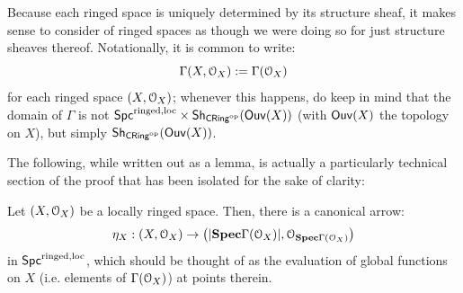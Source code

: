                 \begin{remark}
                    Because each ringed space is uniquely determined by its structure sheaf, it makes sense to consider  of ringed spaces as though we were doing so for just structure sheaves thereof. Notationally, it is common to write:
                        $$\Gamma(X, \mathcal{O}_X) := \Gamma(\mathcal{O}_X)$$
                    for each ringed space $(X, \mathcal{O}_X)$; whenever this happens, do keep in mind that the domain of $\Gamma$ is not $\Spc^{\ringed, \loc} \x \Sh_{\Cring^{\op}}(\Ouv(X))$ (with $\mathsf{Ouv}(X)$ the topology on $X$), but simply $\mathsf{Sh}_{\mathsf{CRing}^{\mathrm{op}}}(\mathsf{Ouv}(X))$.   
                \end{remark}
                    
                The following, while written out as a lemma, is actually a particularly technical section of the proof that has been isolated for the sake of clarity:
                \begin{lemma}\label{lemma: adjunction_unit_ringed_spaces}
                    Let $(X, \mathcal{O}_X)$ be a locally ringed space. Then, there is a canonical arrow:
                        $$\eta_X: (X, \mathcal{O}_X) \to \left(|\mathbf{Spec} \Gamma(\mathcal{O}_X)|, \mathcal{O}_{\mathbf{Spec} \Gamma(\mathcal{O}_X)}\right)$$
                    in $\mathsf{Spc}^{\mathrm{ringed}, \mathrm{loc}}$, which should be thought of as the evaluation of global functions on $X$ (i.e. elements of $\Gamma(\mathcal{O}_X)$) at points therein.
                \end{lemma}

